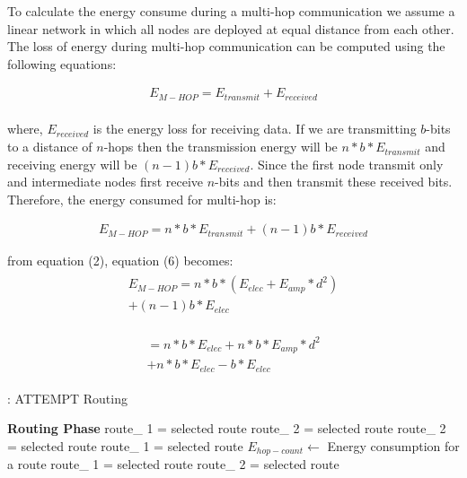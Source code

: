 \documentclass[journal]{IEEEtran}
\begin{document}
To calculate the energy consume during a multi-hop communication we assume a linear network in which all nodes are deployed at equal distance from each other. The loss of energy during multi-hop communication can be computed using the following equations:

\begin{eqnarray}
E_{M-HOP}= E_{transmit}+E _{received}
\end{eqnarray}
\\
where, $E _{received}$ is the energy loss for receiving data. If we are transmitting $b$-bits to a distance of $n$-hops then the transmission energy will be $n*b*E_{transmit}$ and receiving energy will be $(n-1)b*E _{received}$. Since the first node transmit only and intermediate nodes first receive $n$-bits and then transmit these received bits. Therefore, the energy consumed for multi-hop is:


\begin{eqnarray}
E_{M-HOP} = n*b*E_{transmit}+ (n-1)b*E _{received}
\end{eqnarray}

from equation (2), equation (6) becomes:
\begin{eqnarray}
\begin{split}
E_{M-HOP} = n*b*(E_{elec}+ E_{amp}* d^{2})\\ + (n-1)b*E_{elec}
\end{split}
\end{eqnarray}


\begin{eqnarray}
\begin{split}
= n*b*E_{elec}+ n*b*E_{amp}*d^{2}\\+n*b*E_{elec}-b*E_{elec}
\end{split}
\end{eqnarray}


\begin{algorithm}[H]
\caption{: ATTEMPT Routing}
\begin{algorithmic}[1]
\STATE \textbf{Routing Phase}
                \STATE route\_  1 = selected route
              \ELSE
               \STATE route\_  2 = selected route
                \STATE route\_  2 = selected route
              \ELSE
               \STATE route\_  1 = selected route
               \STATE $E_{hop-count} \gets$ Energy consumption for a route
                \STATE route\_  1 = selected route
              \ELSE
               \STATE route\_  2 = selected route
                          \ENDIF
                          \ENDIF
                          \ENDIF
                             \ENDIF
                          \end{algorithmic}
                           \end{algorithm}
\end{document}
